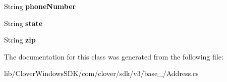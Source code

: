\begin{DoxyCompactItemize}
\mbox{\label{classcom_1_1clover_1_1sdk_1_1v3_1_1base___1_1_address_a2ea129ee31e4e2f6305cba3dcb050952}} 
String {\bfseries phone\+Number}
\item 
\mbox{\label{classcom_1_1clover_1_1sdk_1_1v3_1_1base___1_1_address_ae698fc4f47947a0b6bd926c03675e624}} 
String {\bfseries state}
\item 
\mbox{\label{classcom_1_1clover_1_1sdk_1_1v3_1_1base___1_1_address_a27730d0ec203f67330094e43d9ab4fb4}} 
String {\bfseries zip}
\end{DoxyCompactItemize}


The documentation for this class was generated from the following file\+:\begin{DoxyCompactItemize}
\item 
lib/\+Clover\+Windows\+S\+D\+K/com/clover/sdk/v3/base\+\_\+/Address.\+cs\end{DoxyCompactItemize}
